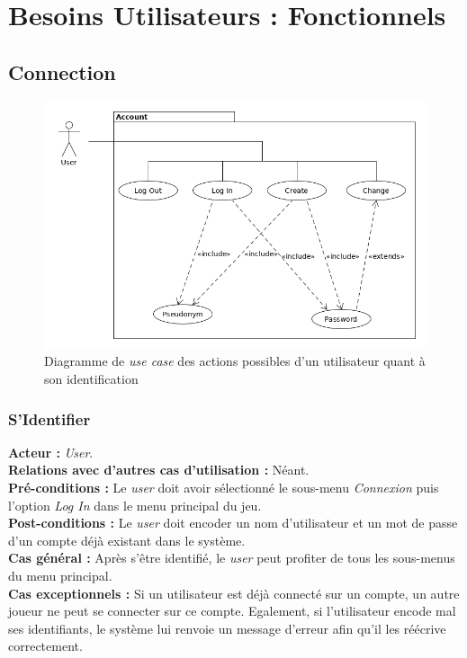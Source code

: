 \documentclass[10pt, a4paper]{article}
\begin{document}

\section{Besoins Utilisateurs : Fonctionnels}
		
		
\subsection{Connection}

\begin{figure}[ht]
\includegraphics[scale=0.5]{UC_connexion.png}
\caption{Diagramme de \textit{use case} des actions possibles d'un utilisateur quant à son identification}
\label{UC_co} %
\end{figure}

\subsubsection{S'Identifier}
\textbf{Acteur :} \textit{User}.\\
\textbf{Relations avec d'autres cas d'utilisation :} Néant.\\
\textbf{Pré-conditions :} Le \textit{user} doit avoir sélectionné le sous-menu \textit{Connexion} puis l'option {\itshape Log In} dans le menu principal du jeu.\\
\textbf{Post-conditions :} Le \textit{user} doit encoder un nom d'utilisateur et un mot de passe d'un compte déjà existant dans le système. \\
\textbf{Cas général :} Après s'être identifié, le \textit{user} peut profiter de tous les sous-menus du menu principal.\\
\textbf{Cas exceptionnels :} Si un utilisateur est déjà connecté sur un compte, un autre joueur ne peut se connecter sur ce compte. Egalement, si l'utilisateur encode mal ses identifiants, le système lui renvoie un message d'erreur afin qu'il les réécrive correctement.
\end{document}
